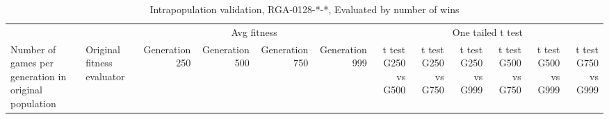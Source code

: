 \begin{landscape}
\begin{table}[ht]
  \centering
    \caption{Intrapopulation validation, RGA-0128-*-*, Evaluated by number of
    wins}
    \begin{tabularx}{\linewidth}{|p{1in}|p{1in}|r|r|r|r|r|r|r|r|r|r|}
\cline{3-12}    \multicolumn{1}{l}{} &  & \multicolumn{4}{c|}{Avg fitness} & \multicolumn{6}{c|}{One tailed t test} \\ \cline{1-12}
    Number of games per generation in original population
    & Original fitness evaluator 
    & \multicolumn{1}{p{0.7in}|}{Generation 250} 
    & \multicolumn{1}{p{0.7in}|}{Generation 500}
    & \multicolumn{1}{p{0.7in}|}{Generation 750}
    & \multicolumn{1}{p{0.7in}|}{Generation 999}
    & \multicolumn{1}{X|}{t test G250 vs G500} 
    & \multicolumn{1}{X|}{t test G250 vs G750}
    & \multicolumn{1}{X|}{t test G250 vs G999}
    & \multicolumn{1}{X|}{t test G500 vs G750}
    & \multicolumn{1}{X|}{t test G500 vs G999}
    & \multicolumn{1}{X|}{t test G750 vs G999} \\ \cline{1-12}


\end{tabularx}
\end{table}
\end{landscape}
